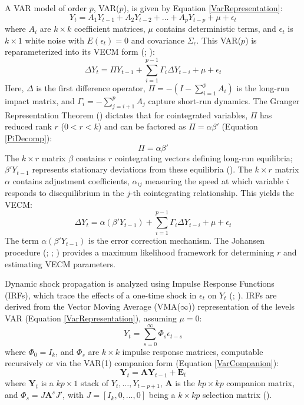 \documentclass[11pt, a4paper, british]{article}
\begin{document}
A VAR model of order $p$, VAR($p$), is given by Equation \ref{VarRepresentation}:
\begin{equation}
 Y_t = A_1 Y_{t-1} + A_2 Y_{t-2} + \dots + A_p Y_{t-p} + \mu + \epsilon_t
    \label{VarRepresentation} 
\end{equation}
where $A_i$ are $k \times k$ coefficient matrices, $\mu$ contains deterministic terms, and $\epsilon_t$ is $k \times 1$ white noise with $E(\epsilon_t)=0$ and covariance $\Sigma_\epsilon$. This VAR($p$) is reparameterized into its VECM form (\cite{l}; \cite{j1995}):
\begin{equation}
    \Delta Y_t = \Pi Y_{t-1} + \sum_{i=1}^{p-1} \Gamma_i \Delta Y_{t-i} + \mu + \epsilon_t
    \label{VarECM} 
\end{equation}
Here, $\Delta$ is the first difference operator, $\Pi = -\left(I - \sum_{i=1}^{p} A_i\right)$ is the long-run impact matrix, and $\Gamma_i = -\sum_{j=i+1}^{p} A_j$ capture short-run dynamics. The Granger Representation Theorem (\cite{eg}) dictates that for cointegrated variables, $\Pi$ has reduced rank $r$ ($0 < r < k$) and can be factored as $\Pi = \alpha \beta'$ (Equation \ref{PiDecomp}):
\begin{equation}
    \Pi = \alpha \beta'
    \label{PiDecomp} 
\end{equation}
The $k \times r$ matrix $\beta$ contains $r$ cointegrating vectors defining long-run equilibria; $\beta'Y_{t-1}$ represents stationary deviations from these equilibria (\cite{j1991}). The $k \times r$ matrix $\alpha$ contains adjustment coefficients, $\alpha_{ij}$ measuring the speed at which variable $i$ responds to disequilibrium in the $j$-th cointegrating relationship. This yields the VECM:
\begin{equation}
    \Delta Y_t = \alpha (\beta'Y_{t-1}) + \sum_{i=1}^{p-1} \Gamma_i \Delta Y_{t-i} + \mu + \epsilon_t
    \label{VECM}
\end{equation}
The term $\alpha (\beta'Y_{t-1})$ is the error correction mechanism. The Johansen procedure (\cite{j1988}; \cite{j1991}; \cite{j1995}) provides a maximum likelihood framework for determining $r$ and estimating VECM parameters.

Dynamic shock propagation is analyzed using Impulse Response Functions (IRFs), which trace the effects of a one-time shock in $\epsilon_t$ on $Y_t$ (\cite{h}; \cite{l}). IRFs are derived from the Vector Moving Average (VMA($\infty$)) representation of the levels VAR (Equation \ref{VarRepresentation}), assuming $\mu=0$:
\begin{equation}
 Y_t = \sum_{s=0}^{\infty} \Phi_s \epsilon_{t-s}
    \label{VMARepresentation} 
\end{equation}
where $\Phi_0 = I_k$, and $\Phi_s$ are $k \times k$ impulse response matrices, computable recursively or via the VAR(1) companion form (Equation \ref{VarCompanion}):
\begin{equation}
    \mathbf{Y}_t = \mathbf{A} \mathbf{Y}_{t-1} + \mathbf{E}_t
    \label{VarCompanion} 
\end{equation}
where $\mathbf{Y}_t$ is a $kp \times 1$ stack of $Y_t, \dots, Y_{t-p+1}$, $\mathbf{A}$ is the $kp \times kp$ companion matrix, and $\Phi_s = J \mathbf{A}^s J'$, with $J = [I_k, 0, \dots, 0]$ being a $k \times kp$ selection matrix (\cite{l}).
\end{document}
